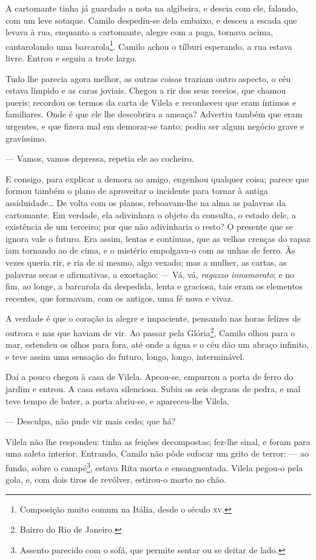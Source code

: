 A cartomante tinha já guardado a nota na algibeira, e descia com ele,
falando, com um leve sotaque. Camilo despediu-se dela embaixo, e desceu
a escada que levava à rua, enquanto a cartomante, alegre com a paga,
tornava acima, cantarolando uma barcarola\footnote{Composição muito
  comum na Itália, desde o século \textsc{xv}.}. Camilo achou
o tílburi esperando, a rua estava livre. Entrou e seguiu a trote largo.

Tudo lhe parecia agora melhor, as outras coisas traziam outro aspecto, o
céu estava límpido e as caras joviais. Chegou a rir dos seus receios,
que chamou pueris; recordou os termos da carta de Vilela e reconheceu
que eram íntimos e familiares. Onde é que ele lhe descobrira a ameaça?
Advertiu também que eram urgentes, e que fizera mal em demorar-se tanto;
podia ser algum negócio grave e gravíssimo.

--- Vamos, vamos depressa, repetia ele ao cocheiro.

E consigo, para explicar a demora ao amigo, engenhou qualquer coisa;
parece que formou também o plano de aproveitar o incidente para tornar à
antiga assiduidade\ldots{} De volta com os planos, reboavam-lhe na alma
as palavras da cartomante. Em verdade, ela adivinhara o objeto da
consulta, o estado dele, a existência de um terceiro; por que não
adivinharia o resto? O presente que se ignora vale o futuro. Era assim,
lentas e contínuas, que as velhas crenças do rapaz iam tornando ao de
cima, e o mistério empolgava-o com as unhas de ferro. Às vezes queria
rir, e ria de si mesmo, algo vexado; mas a mulher, as cartas, as
palavras secas e afirmativas, a exortação: --- Vá, vá, \emph{ragazzo
innamorato}; e no fim, ao longe, a barcarola da despedida, lenta e
graciosa, tais eram os elementos recentes, que formavam, com os antigos,
uma fé nova e vivaz.

A verdade é que o coração ia alegre e impaciente, pensando nas horas
felizes de outrora e nas que haviam de vir. Ao passar pela
Glória\footnote{Bairro do Rio de Janeiro.}, Camilo olhou para o mar,
estendeu os olhos para fora, até onde a água e o céu dão um abraço
infinito, e teve assim uma sensação do futuro, longo, longo,
interminável.

Daí a pouco chegou à casa de Vilela. Apeou-se, empurrou a porta de ferro
do jardim e entrou. A casa estava silenciosa. Subiu os seis degraus de
pedra, e mal teve tempo de bater, a porta abriu-se, e apareceu-lhe
Vilela.

--- Desculpa, não pude vir mais cedo; que há?

Vilela não lhe respondeu: tinha as feições decompostas; fez-lhe sinal, e
foram para uma saleta interior. Entrando, Camilo não pôde sufocar um
grito de terror: --- ao fundo, sobre o canapé\footnote{Assento parecido
  com o sofá, que permite sentar ou se deitar de lado.}, estava Rita
morta e ensanguentada. Vilela pegou-o pela gola, e, com dois tiros de
revólver, estirou-o morto no chão.
